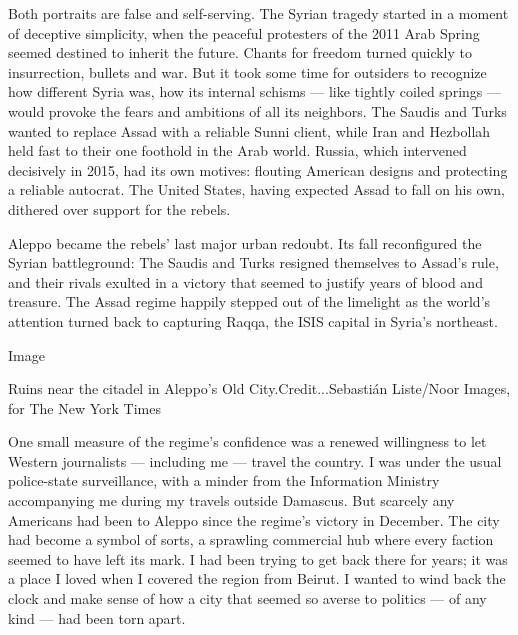 Both portraits are false and self-serving. The Syrian tragedy started in
a moment of deceptive simplicity, when the peaceful protesters of the
2011 Arab Spring seemed destined to inherit the future. Chants for
freedom turned quickly to insurrection, bullets and war. But it took
some time for outsiders to recognize how different Syria was, how its
internal schisms --- like tightly coiled springs --- would provoke the
fears and ambitions of all its neighbors. The Saudis and Turks wanted to
replace Assad with a reliable Sunni client, while Iran and Hezbollah
held fast to their one foothold in the Arab world. Russia, which
intervened decisively in 2015, had its own motives: flouting American
designs and protecting a reliable autocrat. The United States, having
expected Assad to fall on his own, dithered over support for the rebels.

Aleppo became the rebels' last major urban redoubt. Its fall
reconfigured the Syrian battleground: The Saudis and Turks resigned
themselves to Assad's rule, and their rivals exulted in a victory that
seemed to justify years of blood and treasure. The Assad regime happily
stepped out of the limelight as the world's attention turned back to
capturing Raqqa, the ISIS capital in Syria's northeast.

Image

Ruins near the citadel in Aleppo's Old City.Credit...Sebastián
Liste/Noor Images, for The New York Times

One small measure of the regime's confidence was a renewed willingness
to let Western journalists --- including me --- travel the country. I
was under the usual police-state surveillance, with a minder from the
Information Ministry accompanying me during my travels outside Damascus.
But scarcely any Americans had been to Aleppo since the regime's victory
in December. The city had become a symbol of sorts, a sprawling
commercial hub where every faction seemed to have left its mark. I had
been trying to get back there for years; it was a place I loved when I
covered the region from Beirut. I wanted to wind back the clock and make
sense of how a city that seemed so averse to politics --- of any kind
--- had been torn apart.

